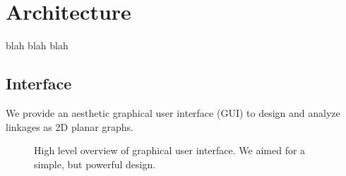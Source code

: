 \documentclass[aps,prd,final,twocolumn,letterpaper,nofootinbib]{revtex4-1}
\begin{document}
\section{Architecture}
\label{sec:arch}

blah blah blah

\subsection{Interface}

We provide an aesthetic graphical user interface (GUI)
to design and analyze linkages as 2D planar graphs.

\begin{figure}[ht]
\caption{High level overview of graphical user interface.
We aimed for a simple, but powerful design.}
\label{fig:ui}
\end{figure}
\end{document}
